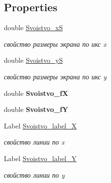 \subsection*{Properties}
\begin{DoxyCompactItemize}
\item 
double \hyperlink{class_client_1_1_line_coord_a8008869c1c2c60c6d1236f80200c383e}{Svoistvo\+\_\+xS}
\begin{DoxyCompactList}\small\item\em свойство размеры экрана по икс x \end{DoxyCompactList}\item 
double \hyperlink{class_client_1_1_line_coord_a71bf6f4176e9f7becd572f44f1d4948f}{Svoistvo\+\_\+yS}
\begin{DoxyCompactList}\small\item\em свойство размеры экрана по икс y \end{DoxyCompactList}\item 
\hypertarget{class_client_1_1_line_coord_a3c39c4ced2b59ddbe0ab9960a456bf72}{}\label{class_client_1_1_line_coord_a3c39c4ced2b59ddbe0ab9960a456bf72} 
double {\bfseries Svoistvo\+\_\+fX}
\item 
\hypertarget{class_client_1_1_line_coord_a830f017bd6a6606bc5efd1515cf3fc97}{}\label{class_client_1_1_line_coord_a830f017bd6a6606bc5efd1515cf3fc97} 
double {\bfseries Svoistvo\+\_\+fY}
\item 
Label \hyperlink{class_client_1_1_line_coord_ab896e31d73c3bd32bbec4c389b075f19}{Svoistvo\+\_\+label\+\_\+X}
\begin{DoxyCompactList}\small\item\em свойство линии по x \end{DoxyCompactList}\item 
Label \hyperlink{class_client_1_1_line_coord_a78a8315868d88677c9780a1025bfc604}{Svoistvo\+\_\+label\+\_\+Y}
\begin{DoxyCompactList}\small\item\em свойство линии по y \end{DoxyCompactList}\item 

\end{DoxyCompactItemize}
